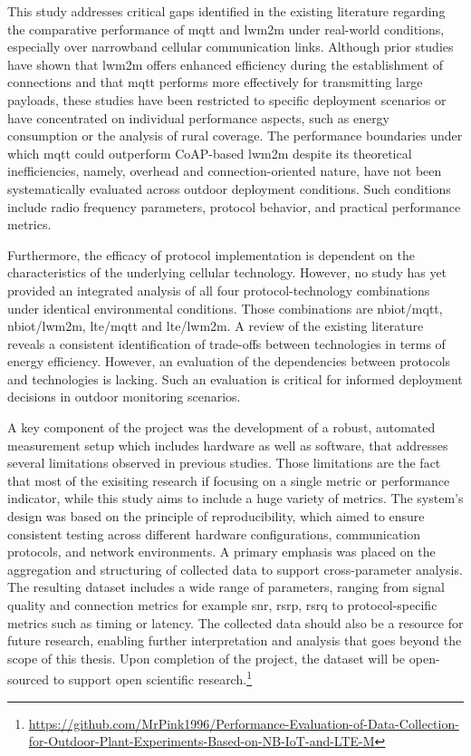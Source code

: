 \documentclass[12pt, english, openany]{book}
\begin{document}
This study addresses critical gaps identified in the existing literature regarding the comparative performance of \gls{mqtt} and \gls{lwm2m} under real-world conditions, especially over narrowband cellular communication links. Although prior studies have shown that \gls{lwm2m} offers enhanced efficiency during the establishment of connections and that \gls{mqtt} performs more effectively for transmitting large payloads, these studies have been restricted to specific deployment scenarios or have concentrated on individual performance aspects, such as energy consumption or the analysis of rural coverage. The performance boundaries under which \gls{mqtt} could outperform CoAP-based \gls{lwm2m} despite its theoretical inefficiencies, namely, overhead and connection-oriented nature, have not been systematically evaluated across outdoor deployment conditions. Such conditions include radio frequency parameters, protocol behavior, and practical performance metrics.

Furthermore, the efficacy of protocol implementation is dependent on the characteristics of the underlying cellular technology. However, no study has yet provided an integrated analysis of all four protocol-technology combinations under identical environmental conditions. Those combinations are \gls{nbiot}/\gls{mqtt}, \gls{nbiot}/\gls{lwm2m}, \gls{lte}/\gls{mqtt} and \gls{lte}/\gls{lwm2m}. A review of the existing literature reveals a consistent identification of trade-offs between technologies in terms of energy efficiency. However, an evaluation of the dependencies between protocols and technologies is lacking. Such an evaluation is critical for informed deployment decisions in outdoor monitoring scenarios.

A key component of the project was the development of a robust, automated measurement setup which includes hardware as well as software, that addresses several limitations observed in previous studies. Those limitations are the fact that most of the exisiting research if focusing on a single metric or performance indicator, while this study aims to include a huge variety of metrics. The system's design was based on the principle of reproducibility, which aimed to ensure consistent testing across different hardware configurations, communication protocols, and network environments. A primary emphasis was placed on the aggregation and structuring of collected data to support cross-parameter analysis. The resulting dataset includes a wide range of parameters, ranging from signal quality and connection metrics for example snr, rsrp, rsrq to protocol-specific metrics such as timing or latency.
The collected data should also be a resource for future research, enabling further interpretation and analysis that goes beyond the scope of this thesis. Upon completion of the project, the dataset will be open-sourced to support open scientific research.\footnote{\url{https://github.com/MrPink1996/Performance-Evaluation-of-Data-Collection-for-Outdoor-Plant-Experiments-Based-on-NB-IoT-and-LTE-M}}
\end{document}
